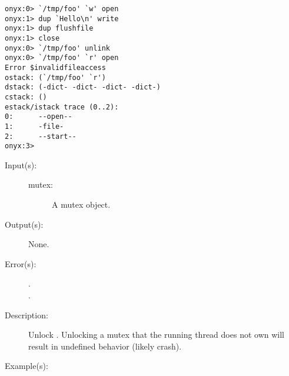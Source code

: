 \begin{description}
\begin{description}
\begin{verbatim}
onyx:0> `/tmp/foo' `w' open
onyx:1> dup `Hello\n' write
onyx:1> dup flushfile
onyx:1> close
onyx:0> `/tmp/foo' unlink
onyx:0> `/tmp/foo' `r' open
Error $invalidfileaccess
ostack: (`/tmp/foo' `r')
dstack: (-dict- -dict- -dict- -dict-)
cstack: ()
estack/istack trace (0..2):
0:      --open--
1:      -file-
2:      --start--
onyx:3>
		\end{verbatim}
	\end{description}
\label{systemdict:unlock}
\item[{\onyxop{mutex}{unlock}{--}}: ]
	\begin{description}\item[]
	\item[Input(s): ]
		\begin{description}\item[]
		\item[mutex: ]
			A mutex object.
		\end{description}
	\item[Output(s): ] None.
	\item[Error(s): ]
		\begin{description}\item[]
		\item[.]
		\item[.]
		\end{description}
	\item[Description: ]
		Unlock .  Unlocking a mutex that the running thread
		does not own will result in undefined behavior (likely crash).
	\item[Example(s): ]\begin{verbatim}


\end{verbatim}
\end{description}
\end{description}
